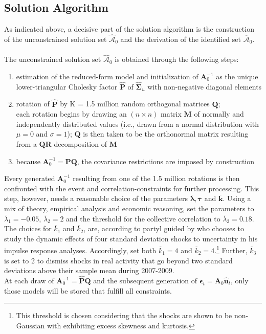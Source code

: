 \documentclass[a4paper,11pt,listof=nochaptergap,oneside,pointednumbers,bibtotoc,bigheadings,liststotoc]{scrbook}
\theoremstyle{mysatz}
\theoremstyle{mydefinition}
\theoremstyle{mybemerkung}
\let\oldhat\hat
\newcommand{\vect}[1]{\boldsymbol{\mathbf{#1}}}
\newcommand{\hatt}[1]{\oldhat{\boldsymbol{\mathbf{#1}}}}
\begin{document}
\subsection{Solution Algorithm}
As indicated above, a decisive part of the solution algorithm is the construction of the unconstrained solution set $\hatt{\mathcal{A}}_0$ and the derivation of the identified set $\overline{\vect{\mathcal{A}}}_0$. \\
\\
The unconstrained solution set $\hatt{\mathcal{A}}_0$ is obtained through the following steps:
\begin{enumerate}[i]
	\item estimation of the reduced-form model and initialization of $\vect{A}_0^{-1}$ as the unique lower-triangular Cholesky factor $\hatt{\vect{P}}$ of $\hatt{\vect{\Sigma}}_u$ with non-negative diagonal elements
	\item rotation of $\hatt{\vect{P}}$ by K = 1.5 million random orthogonal matrices $\vect{Q}$;\\
	 each rotation begins by drawing an $(n \times n)$ matrix $\vect{M}$ of normally and independently distributed values (i.e., drawn from a normal distribution with $\mu = 0$ and $\sigma = 1$); $\vect{Q}$ is then taken to be the orthonormal matrix resulting from a $\vect{Q}\vect{R}$ decomposition of $\vect{M}$
	 \item because $\vect{A}_0^{-1} = \vect{P}\vect{Q}$, the covariance restrictions are imposed by construction 
\end{enumerate}

Every generated $\vect{A}_0^{-1}$ resulting from one of the 1.5 million rotations is then confronted with the event and correlation-constraints for further processing. This step, however, needs a reasonable choice of the parameters $\overline{\vect{\lambda}}, \overline{\vect{\tau}}$ and $\overline{\vect{k}}$. Using a mix of theory, empirical analysis and economic reasoning, \citet{ludvigsonetal:18} set the parameters to  $\overline{\lambda}_1 = -0.05$, $\overline{\lambda}_2 = 2$ and the threshold for the collective correlation to $\overline{\lambda}_3 = 0.18$. The choices for $\overline{k}_1$ and $\overline{k}_2$, are, according to \citet{ludvigsonetal:18} partyl guided by \citet{bloom:09} who chooses to study the dynamic effects of four standard deviation shocks to uncertainty in his impulse response analyses. Accordingly, \citet{ludvigsonetal:18} set both $\overline{k}_1 = 4$ and $\overline{k}_2 = 4$.\footnote{This threshold is chosen considering that the shocks are shown to be non-Gaussian with exhibiting excess skewness and kurtosis.} Further, $\overline{k}_3$ is set to 2 to dismiss shocks in real activity that go beyond two standard deviations above their sample mean during 2007-2009.
\\
At each draw of $\vect{A}_0^{-1} = \hatt{\vect{P}}\vect{Q}$ and the subsequent generation of $\vect{\epsilon}_t = \vect{A}_0\hatt{\vect{u}}_t$, only those models will be stored that fulfill all constraints.
\end{document}

